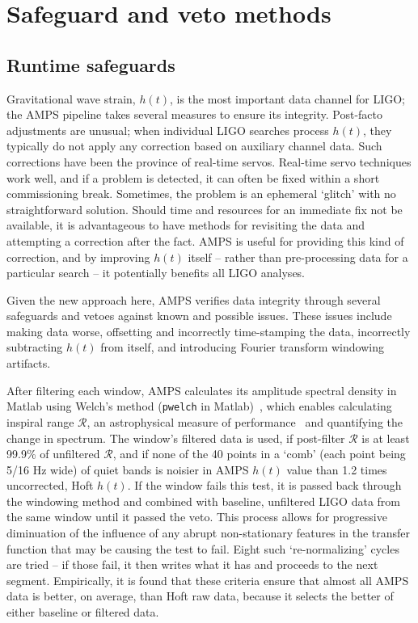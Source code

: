 \section{Safeguard and veto methods}
\label{safeguards}

    \subsection{Runtime safeguards}
    \label{runtimeSafeguards}

Gravitational wave strain, $h(t)$, is the most important data channel for LIGO; the AMPS pipeline takes several measures to ensure its integrity. Post-facto adjustments are unusual; when individual LIGO searches process $h(t)$, they typically do not apply any correction based on auxiliary channel data. Such corrections have been the province of real-time servos. Real-time servo techniques work well, and if a problem is detected, it can often be fixed within a short commissioning break. Sometimes, the problem is an ephemeral `glitch' with no straightforward solution. Should time and resources for an immediate fix not be available, it is advantageous to have methods for revisiting the data and attempting a correction after the fact. AMPS is useful for providing this kind of correction, and by improving $h(t)$ itself -- rather than pre-processing data for a particular search -- it potentially benefits all LIGO analyses.

Given the new approach here, AMPS verifies data integrity through several safeguards and vetoes against known and possible issues. These issues include making data worse, offsetting and incorrectly time-stamping the data, incorrectly subtracting $h(t)$ from itself, and introducing Fourier transform windowing artifacts.

After filtering each window, AMPS calculates its amplitude spectral density in Matlab using Welch's method (\texttt{pwelch} in Matlab)~\cite{Matlab2012a,Welch1967}, which enables calculating inspiral range $\mathcal{R}$, an astrophysical measure of performance~\cite{FinnInspiral1993} and quantifying  the change in spectrum. The window's filtered data is used, if post-filter $\mathcal{R}$ is at least 99.9\% of unfiltered $\mathcal{R}$, and if none of the 40 points in a `comb' (each point being 5/16 Hz wide) of quiet bands is noisier in AMPS $h(t)$ value than 1.2 times uncorrected, Hoft $h(t)$. If the window fails this test, it is passed back through the windowing method and combined with baseline, unfiltered LIGO data from the same window until it passed the veto. This process allows for progressive diminuation of the influence of any abrupt non-stationary features in the transfer function that may be causing the test to fail. Eight such `re-normalizing' cycles are tried -- if those fail, it then writes what it has and proceeds to the next segment. Empirically, it is found that these criteria ensure that almost all AMPS data is better, on average, than Hoft raw data, because it selects the better of either baseline or filtered data.


